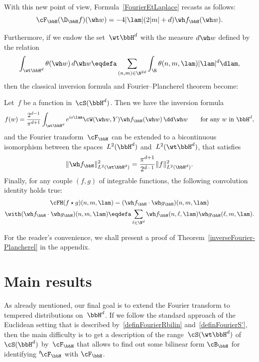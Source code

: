 With this new point of view, Formula~\eqref{FourierEtLaplace} recasts as follows:
\[
\cF_{\bbH}(\D_\bbH f) (\wh w) = -4|\lam|(2|m|+d) \wh f_\bbH(\wh w).
\]

Furthermore, if we endow the set~$\wt \bbH^d$ with the measure $d\wh w$ defined by the relation
\[
\int_{\wt \bbH^d} \theta (\wh w)\, d\wh w\eqdefa \sum_{(n,m)\in \N^{2d}} \int_{\R} \theta (n,m,\lam) |\lam|^d \dlam,
\]
then the classical inversion formula and Fourier--Plancherel theorem become:

\begin{theo}\label{inverseFourier-Plancherel}
Let~$f$ be a function in~$\cS(\bbH^d)$. Then we have the inversion formula
\begin{equation}\label{MappingofPHdemoeq1}
f(w) = \frac {2^{d-1}} {\pi^{d+1} } \int_{\wt \bbH^d} e^{is\lam} \cW(\wh w, Y)\wh f_\bbH (\wh w) \, \dd\wh w\qquad\hbox{for any}\ w \hbox{ in}\ \bbH^d,
\end{equation}
and the Fourier transform~$\cF_{\bbH}$ can be extended to a bicontinuous isomorphism between the spaces~$L^2(\bbH^d)$ and~$L^2(\wt \bbH^d)$, that satisfies
\begin{equation}\label{inverseFouriereq2}
\|\wh f_\bbH\|_{L^2(\wt \bbH^d)}^2 = \frac {\pi^{d+1}} {2^{d-1}} \|f\|_{L^2(\bbH^d)}^2.
\end{equation}
Finally, for any couple $(f,g)$ of integrable functions, the following convolution identity holds true:
\begin{multline}\label{newFourierconvoleq1}
\cFH (f\star g) (n,m,\lam) = (\wh f_\bbH \cdot \wh g_\bbH)(n,m,\lam)\\
\with (\wh f_\bbH \cdot \wh g_\bbH)(n,m,\lam) \eqdefa \sum_{\ell\in \N^{d}} \wh f_\bbH(n,\ell,\lam)\wh g_\bbH(\ell,m,\lam).
\end{multline}
\end{theo}

For the reader's convenience, we shall present a proof of Theorem~\ref{inverseFourier-Plancherel} in the appendix.


\section{Main results} \label{main}

As already mentioned, our final goal is to extend the Fourier transform to tempered distributions on~$\bbH^d$. If we follow the standard approach of the Euclidean setting that is described by~\eqref{definFourierRbilin} and~\eqref{definFourierS'}, then the main difficulty is to get a description of the range~$\cS(\wt\bbH^d)$ of~$\cS(\bbH^d)$ by~$\cF_\bbH$ that allows to find out some bilinear form $\cB_\bbH$ for identifying ${}^t\!\cF_\bbH$ with $\cF_\bbH$.

